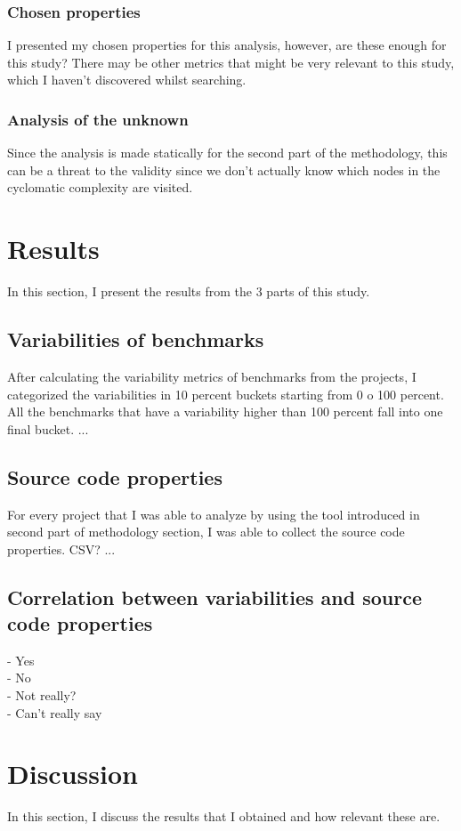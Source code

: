 \documentclass{seal_thesis}
\begin{document}
\subsection{Chosen properties}
I presented my chosen properties for this analysis, however, are these enough for this study? There may be other metrics that might be very relevant to this study, which I haven't discovered whilst searching.

\subsection{Analysis of the unknown}
Since the analysis is made statically for the second part of the methodology, this can be a threat to the validity since we don't actually know which nodes in the cyclomatic complexity are visited.


\chapter{Results}
\label{Results}
In this section, I present the results from the 3 parts of this study. 
\section{Variabilities of benchmarks}
After calculating the variability metrics of benchmarks from the projects, I categorized the variabilities in 10 percent buckets starting from 0 o 100 percent. All the benchmarks that have a variability higher than 100 percent fall into one final bucket. ...

\section{Source code properties}
For every project that I was able to analyze by using the tool introduced in second part of methodology section, I was able to collect the source code properties. CSV? ...

\section{Correlation between variabilities and source code properties}
- Yes \\
- No \\
- Not really? \\
- Can't really say \\


\chapter{Discussion}
\label{Discussion}
In this section, I discuss the results that I obtained and how relevant these are.
\end{document}

